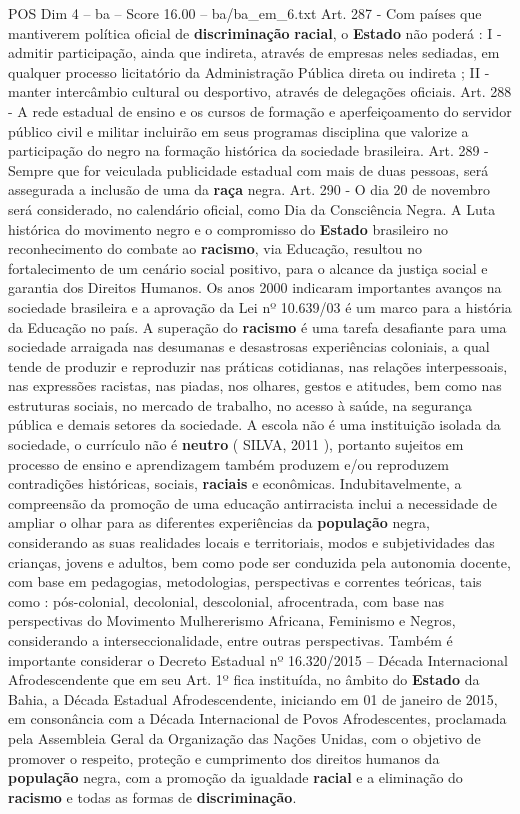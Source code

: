 \begin{textsample}{POS Dim 4 – ba – Score 16.00 – ba/ba\_em\_6.txt}
Art. 287 - Com países que mantiverem política oficial de \textbf{discriminação} \textbf{racial}, o \textbf{Estado} não poderá : I - admitir participação, ainda que indireta, através de empresas neles sediadas, em qualquer processo licitatório da Administração Pública direta ou indireta ; II - manter intercâmbio cultural ou desportivo, através de delegações oficiais.
Art. 288 - A rede estadual de ensino e os cursos de formação e aperfeiçoamento do servidor público civil e militar incluirão em seus programas disciplina que valorize a participação do negro na formação histórica da sociedade brasileira.
Art. 289 - Sempre que for veiculada publicidade estadual com mais de duas pessoas, será assegurada a inclusão de uma da \textbf{raça} negra.
Art. 290 - O dia 20 de novembro será considerado, no calendário oficial, como Dia da Consciência Negra.
A Luta histórica do movimento negro e o compromisso do \textbf{Estado} brasileiro no reconhecimento do combate ao \textbf{racismo}, via Educação, resultou no fortalecimento de um cenário social positivo, para o alcance da justiça social e garantia dos Direitos Humanos.
Os anos 2000 indicaram importantes avanços na sociedade brasileira e a aprovação da Lei nº 10.639/03 é um marco para a história da Educação no país.
A superação do \textbf{racismo} é uma tarefa desafiante para uma sociedade arraigada nas desumanas e desastrosas experiências coloniais, a qual tende de produzir e reproduzir nas práticas cotidianas, nas relações interpessoais, nas expressões racistas, nas piadas, nos olhares, gestos e atitudes, bem como nas estruturas sociais, no mercado de trabalho, no acesso à saúde, na segurança pública e demais setores da sociedade.
A escola não é uma instituição isolada da sociedade, o currículo não é \textbf{neutro} ( SILVA, 2011 ), portanto sujeitos em processo de ensino e aprendizagem também produzem e/ou reproduzem contradições históricas, sociais, \textbf{raciais} e econômicas.
Indubitavelmente, a compreensão da promoção de uma educação antirracista inclui a necessidade de ampliar o olhar para as diferentes experiências da \textbf{população} negra, considerando as suas realidades locais e territoriais, modos e subjetividades das crianças, jovens e adultos, bem como pode ser conduzida pela autonomia docente, com base em pedagogias, metodologias, perspectivas e correntes teóricas, tais como : pós-colonial, decolonial, descolonial, afrocentrada, com base nas perspectivas do Movimento Mulhererismo Africana, Feminismo e Negros, considerando a interseccionalidade, entre outras perspectivas.
Também é importante considerar o Decreto Estadual nº 16.320/2015 – Década Internacional Afrodescendente que em seu Art. 1º fica instituída, no âmbito do \textbf{Estado} da Bahia, a Década Estadual Afrodescendente, iniciando em 01 de janeiro de 2015, em consonância com a Década Internacional de Povos Afrodescentes, proclamada pela Assembleia Geral da Organização das Nações Unidas, com o objetivo de promover o respeito, proteção e cumprimento dos direitos humanos da \textbf{população} negra, com a promoção da igualdade \textbf{racial} e a eliminação do \textbf{racismo} e todas as formas de \textbf{discriminação}.

\end{textsample}

